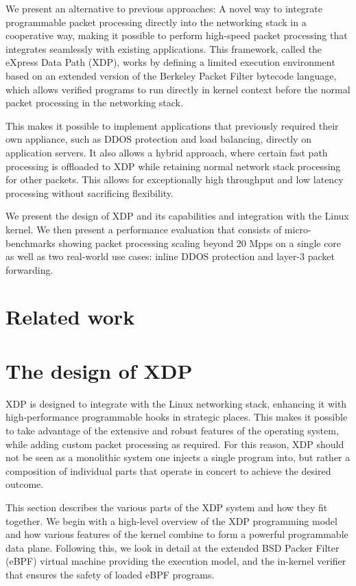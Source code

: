 \documentclass[10pt]{sig-alternate-05-2015}
\begin{document}
We present an alternative to previous approaches: A novel way to integrate
programmable packet processing directly into the networking stack in a
cooperative way, making it possible to perform high-speed packet processing that
integrates seamlessly with existing applications. This framework, called the
eXpress Data Path (XDP), works by defining a limited execution environment based
on an extended version of the Berkeley Packet Filter bytecode language, which
allows verified programs to run directly in kernel context before the normal
packet processing in the networking stack.

This makes it possible to implement applications that previously required their
own appliance, such as DDOS protection and load balancing, directly on
application servers. It also allows a hybrid approach, where certain fast path
processing is offloaded to XDP while retaining normal network stack processing
for other packets. This allows for exceptionally high throughput and low latency
processing without sacrificing flexibility.

We present the design of XDP and its capabilities and integration with the Linux
kernel. We then present a performance evaluation that consists of
micro-benchmarks showing packet processing scaling beyond 20 Mpps on a single
core as well as two real-world use cases: inline DDOS protection and layer-3
packet forwarding.

\section{Related work}
\label{sec:related-work}
\section{The design of XDP}
\label{sec:design}
XDP is designed to integrate with the Linux networking stack, enhancing it with
high-performance programmable hooks in strategic places. This makes it possible
to take advantage of the extensive and robust features of the operating system,
while adding custom packet processing as required. For this reason, XDP should
not be seen as a monolithic system one injects a single program into, but rather
a composition of individual parts that operate in concert to achieve the desired
outcome.

This section describes the various parts of the XDP system and how they fit
together. We begin with a high-level overview of the XDP programming model and
how various features of the kernel combine to form a powerful programmable data
plane. Following this, we look in detail at the extended BSD Packer Filter
(eBPF) virtual machine providing the execution model, and the in-kernel verifier
that ensures the safety of loaded eBPF programs.
\end{document}
